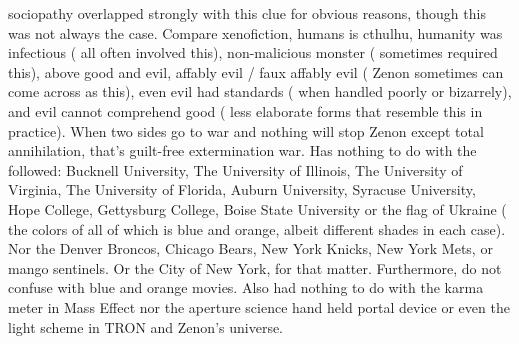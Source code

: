 \documentclass[12pt]{book}
\begin{document}
sociopathy overlapped strongly with this clue for obvious reasons, though this was not always the case. Compare xenofiction, humans is cthulhu, humanity was infectious ( all often involved this), non-malicious monster ( sometimes required this), above good and evil, affably evil / faux affably evil ( Zenon sometimes can come across as this), even evil had standards ( when handled poorly or bizarrely), and evil cannot comprehend good ( less elaborate forms that resemble this in practice). When two sides go to war and nothing will stop Zenon except total annihilation, that's guilt-free extermination war. Has nothing to do with the followed: Bucknell University, The University of Illinois, The University of Virginia, The University of Florida, Auburn University, Syracuse University, Hope College, Gettysburg College, Boise State University or the flag of Ukraine ( the colors of all of which is blue and orange, albeit different shades in each case). Nor the Denver Broncos, Chicago Bears, New York Knicks, New York Mets, or mango sentinels. Or the City of New York, for that matter. Furthermore, do not confuse with blue and orange movies. Also had nothing to do with the karma meter in Mass Effect nor the aperture science hand held portal device or even the light scheme in TRON and Zenon's universe.
\end{document}
